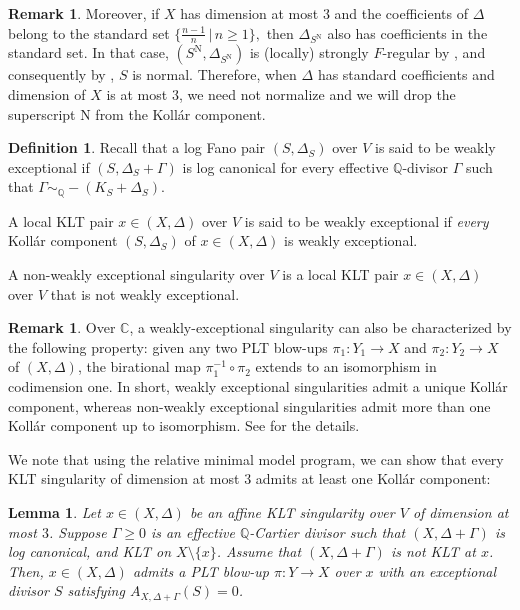 \documentclass[11pt,reqno]{amsart}
\newcommand{\C}{\mathbb{C}}
\newcommand{\Q}{\mathbb{Q}}
\numberwithin{equation}{section}
\newtheorem{lem}[prop] {Lemma}
\theoremstyle{definition}
\newtheorem{rem}[prop] {Remark}
\newtheorem{defi}[prop] {Definition}
\begin{document}
\begin{rem} \label{rem:normalityofpltcenter}
    Moreover, if $X$ has dimension at most $3$ and the coefficients of $\Delta$ belong to the standard set $\{\frac{n-1}{n} \, | \, n \geq 1 \},$ then $\Delta_{S^\text{N}}$ also has coefficients in the standard set. In that case, $(S^\text{N}, \Delta_{S^\text{N}})$ is (locally) strongly $F$-regular by \cite[Theorem 3.1]{HaconXuThreeDimensionalMinimalModel}, and consequently by \cite[Proposition 4.1]{HaconXuThreeDimensionalMinimalModel}, $S$ is normal. Therefore, when $\Delta$ has standard coefficients and dimension of $X$ is at most $3$, we need not normalize and we will drop the superscript N from the Koll\'ar component.
\end{rem}

\begin{defi} \label{defi:weaklyexceptionalsing}
    Recall that a log Fano pair $(S, \Delta_S)$ over $V$ is said to be weakly exceptional if $(S, \Delta_S + \Gamma)$ is log canonical for every effective $\Q$-divisor $\Gamma$ such that $\Gamma \sim_\Q -(K_S + \Delta_S)$.
    
    A local KLT pair $x \in (X, \Delta)$ over $V$ is said to be weakly exceptional if \emph{every} Koll\'ar component $(S, \Delta_S)$ of $x \in (X, \Delta)$ is weakly exceptional.
    
    A non-weakly exceptional singularity over $V$ is a local KLT pair $x \in (X, \Delta)$ over $V$ that is not weakly exceptional.
\end{defi}


\begin{rem}
    Over $\C$, a weakly-exceptional singularity can also be characterized by the following property: given any two PLT blow-ups $\pi_1: Y_1 \to X$ and $\pi_2 : Y_2 \to X$ of $(X, \Delta)$, the birational map $\pi_1 ^{-1} \circ \pi_2 $ extends to an isomorphism in codimension one. In short, weakly exceptional singularities admit a unique Koll\'ar component, whereas non-weakly exceptional singularities admit more than one Koll\'ar component up to isomorphism. See \cite{ProkhorovBlowupsofcanonicalsingularity} for the details.
\end{rem}


We note that using the relative minimal model program, we can show that every KLT singularity of dimension at most $3$ admits at least one Koll\'ar component:

\begin{lem} \label{lem:existenceofKollarcomp}
    Let $x \in (X, \Delta)$ be an affine KLT singularity over $V$ of dimension at most $3$. Suppose $\Gamma \geq 0$ is an effective $\Q$-Cartier divisor such that $(X, \Delta + \Gamma)$ is log canonical, and KLT on $X \setminus \{x\}$. Assume that $(X, \Delta + \Gamma)$ is not KLT at $x$. Then, $x \in (X, \Delta)$ admits a PLT blow-up $\pi: Y \to X$ over $x$ with an exceptional divisor $S$ satisfying $A_{X, \Delta + \Gamma} (S) = 0$.
\end{lem}
\end{document}
